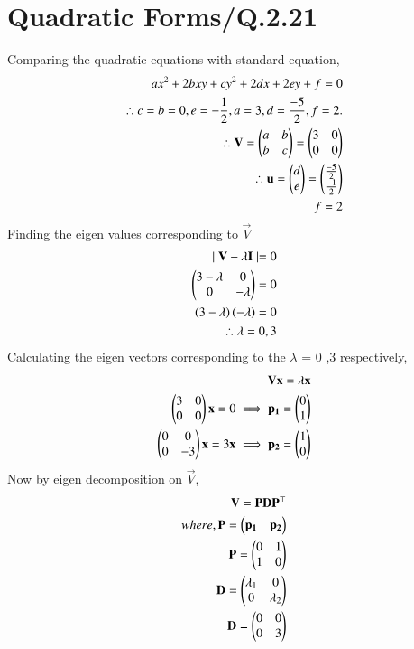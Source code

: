 \documentclass[journal,12pt,twocolumn]{IEEEtran}
\begin{document}
\section{Quadratic Forms/Q.2.21}
Comparing the quadratic equations with standard equation,
\begin{align}
    ax^2+2bxy+cy^2+2dx+2ey+f=0\\
    \therefore c=b=0,e=-\frac{1}{2}, a=3,d=\frac{-5}{2},f=2.\\
    \therefore \mathbf{V}=\begin{pmatrix}a & b \\ b & c\end{pmatrix}=\begin{pmatrix}3 & 0 \\ 0 & 0\end{pmatrix}\\ \therefore \mathbf{u}=\begin{pmatrix}d \\ e\end{pmatrix}= \begin{pmatrix}\frac{-5}{2} \\ \frac{-1}{2}\end{pmatrix}\\ f=2
\end{align}
 Finding the eigen values corresponding to  $\vec{V}$
\begin{align}
    \mid \mathbf{V}- \lambda \mathbf{I} \mid =0\\
    \begin{pmatrix} 3- \lambda & 0 \\ 0 & -\lambda\end{pmatrix}=0\\
    \left(3 - \lambda\right)\left(-\lambda\right)=0 \\
    \therefore \lambda = 0 ,3 
\end{align}
Calculating the eigen vectors corresponding to the $\lambda$ = 0 ,3 respectively,
\begin{align}
    \mathbf{V}\mathbf{x}=\lambda\mathbf{x}\\
    \begin{pmatrix}3 & 0 \\ 0 & 0\end{pmatrix}\mathbf{x}=0 \implies \mathbf{p_{1}}=\begin{pmatrix}0 \\1\end{pmatrix}\\
    \begin{pmatrix}0 & 0 \\ 0 & -3\end{pmatrix}\mathbf{x} = 3\mathbf{x} \implies \mathbf{p_{2}}= \begin{pmatrix}1 \\ 0\end{pmatrix} \\
\end{align}
Now by eigen decomposition on $\vec{V}$,
\begin{align}
    \mathbf{V}= \mathbf{P}\mathbf{D}\mathbf{P}^{\top}\\
    where,\mathbf{P}= \begin{pmatrix}\mathbf{p_{1}}&\mathbf{p_{2}}\end{pmatrix}\\
    \mathbf{P}=\begin{pmatrix} 0 & 1 \\ 1 & 0\end{pmatrix}\\
    \mathbf{D}= \begin{pmatrix}\lambda_{1} & 0 \\ 0 & \lambda_{2}\end{pmatrix}\\
    \mathbf{D}= \begin{pmatrix}0 & 0 \\ 0 & 3\end{pmatrix}
\end{align}
\end{document}
